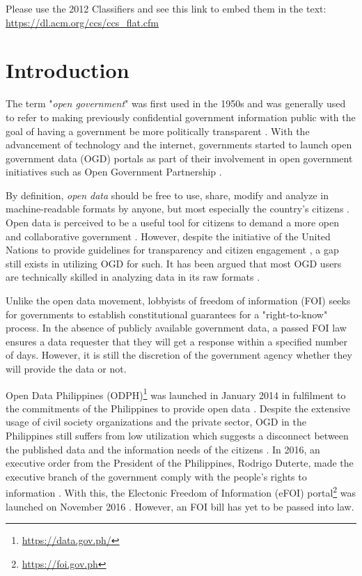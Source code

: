 \documentclass{sigchi}
\def\plainkeywords{Open government data; information seeking; }
\begin{document}

\keywords{\plainkeywords}

\printccsdesc
Please use the 2012 Classifiers and see this link to embed them in the text: \url{https://dl.acm.org/ccs/ccs_flat.cfm}

\section{Introduction}
The term "\textit{open government}" was first used in the 1950s and was generally used to refer to making previously confidential government information public with the goal of having a government be more politically transparent \cite{YuRobinson2012}. With the advancement of technology and the internet, governments started to launch open government data (OGD) portals as part of their involvement in open government initiatives such as Open Government Partnership \cite{DAWES201615, YuRobinson2012}.

By definition, \textit{open data} should be free to use, share, modify and analyze in machine-readable formats by anyone, but most especially the country's citizens \cite{corrales2019knowledge, DAWES201615}. Open data is perceived to be a useful tool for citizens to demand a more open and collaborative government \cite{warwick2017}. However, despite the initiative of the United Nations to provide guidelines for transparency and citizen engagement \cite{UN2013}, a gap still exists in utilizing OGD for such. It has been argued that most OGD users are technically skilled in analyzing data in its raw formats \cite{DAWES201615}. 

Unlike the open data movement, lobbyists of freedom of information (FOI) seeks for governments to establish constitutional guarantees for a "right-to-know" process. In the absence of publicly available government data, a passed FOI law ensures a data requester that they will get a response within a specified number of days. However, it is still the discretion of the government agency whether they will provide the data or not. 

Open Data Philippines (ODPH)\footnote{\url{https://data.gov.ph/}} was launched in January 2014 in fulfilment to the commitments of the Philippines to provide open data \cite{ODPH2015}. Despite the extensive usage of civil society organizations and the private sector, OGD in the Philippines still suffers from low utilization which suggests a disconnect between the published data and the information needs of the citizens \cite{galindesZaplan2018}. In 2016, an executive order from the President of the Philippines, Rodrigo Duterte, made the executive branch of the government comply with the people's rights to information \cite{duterte2016}. With this, the Electonic Freedom of Information (eFOI) portal\footnote{\url{https://foi.gov.ph}} was launched on November 2016 \cite{cigaral2016}. However, an FOI bill has yet to be passed into law. 
\end{document}
